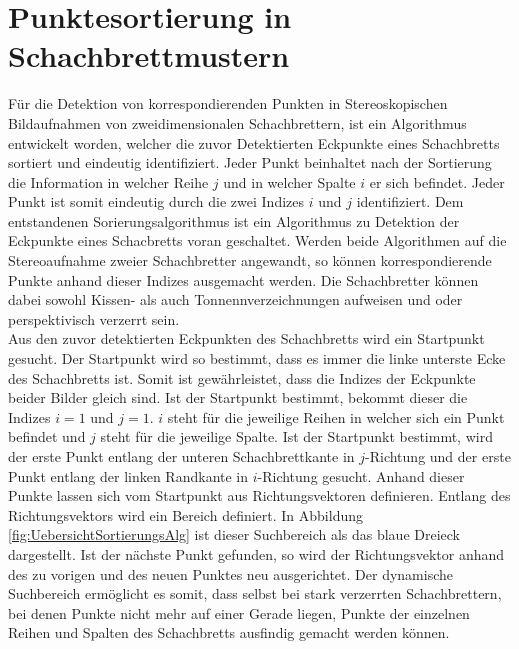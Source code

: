 \chapter{Punktesortierung in Schachbrettmustern}
\label{sec:schachbrettAlg} 


Für die Detektion von korrespondierenden Punkten in Stereoskopischen Bildaufnahmen von zweidimensionalen Schachbrettern, ist ein Algorithmus entwickelt worden, welcher die zuvor Detektierten Eckpunkte eines Schachbretts sortiert und eindeutig identifiziert. Jeder Punkt beinhaltet nach der Sortierung die Information in welcher Reihe $j$ und in welcher Spalte $i$ er sich befindet. Jeder Punkt ist somit eindeutig durch die zwei Indizes $i$ und $j$ identifiziert. Dem entstandenen Sorierungsalgorithmus ist ein Algorithmus zu Detektion der Eckpunkte eines Schacbretts voran geschaltet. Werden beide Algorithmen auf die Stereoaufnahme zweier Schachbretter angewandt, so können korrespondierende Punkte anhand dieser Indizes ausgemacht werden. Die Schachbretter können dabei sowohl Kissen- als auch Tonnennverzeichnungen aufweisen und oder perspektivisch verzerrt sein.\\ 





Aus den zuvor detektierten Eckpunkten des Schachbretts wird ein Startpunkt gesucht. Der Startpunkt wird so bestimmt, dass es immer die linke unterste Ecke des Schachbretts ist. Somit ist gewährleistet, dass die Indizes der Eckpunkte beider Bilder gleich sind. Ist der Startpunkt bestimmt, bekommt dieser die Indizes $i = 1$ und $j = 1$. $i$ steht für die jeweilige Reihen in welcher sich ein Punkt befindet und $j$ steht für die jeweilige Spalte. Ist der Startpunkt bestimmt, wird der erste Punkt entlang der unteren Schachbrettkante in $j$-Richtung und der erste Punkt entlang der linken Randkante in $i$-Richtung gesucht. Anhand dieser Punkte lassen sich vom Startpunkt aus Richtungsvektoren definieren. Entlang des Richtungsvektors wird ein Bereich definiert. In Abbildung \ref{fig:UebersichtSortierungsAlg} ist dieser Suchbereich als das blaue Dreieck dargestellt. Ist der nächste Punkt gefunden, so wird der Richtungsvektor anhand des zu vorigen und des neuen Punktes neu ausgerichtet. Der dynamische Suchbereich ermöglicht es somit, dass selbst bei stark verzerrten Schachbrettern, bei denen Punkte nicht mehr auf einer Gerade liegen, Punkte der einzelnen Reihen und Spalten des Schachbretts ausfindig gemacht werden können.


